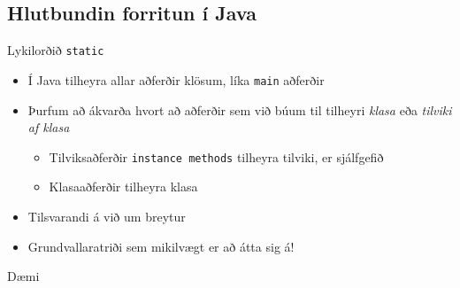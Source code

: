 \documentclass{beamer}
\begin{document}
\subsection{Hlutbundin forritun í Java}

\begin{frame}{Lykilorðið \texttt{static}}
\begin{itemize}
 \item Í Java tilheyra allar aðferðir klösum, líka \texttt{main} aðferðir
 \item Þurfum að ákvarða hvort að aðferðir sem við búum til tilheyri \emph{klasa} eða \emph{tilviki af klasa}
 \begin{itemize}
  \item Tilviksaðferðir \texttt{instance methods} tilheyra tilviki, er sjálfgefið
  \item Klasaaðferðir  tilheyra klasa
 \end{itemize}
 \item Tilsvarandi á við um breytur
 \item Grundvallaratriði sem mikilvægt er að átta sig á!
\end{itemize}
\end{frame}

\begin{frame}{Dæmi}
\end{frame}
\end{document}
